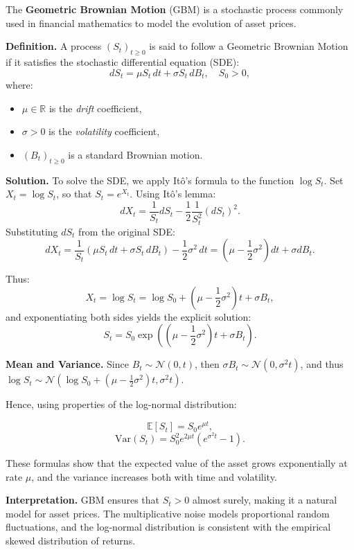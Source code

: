 
The \textbf{Geometric Brownian Motion} (GBM) is a stochastic process commonly used in financial mathematics to model the evolution of asset prices.

\textbf{Definition.} A process \( (S_t)_{t \geq 0} \) is said to follow a Geometric Brownian Motion if it satisfies the stochastic differential equation (SDE):
\[
dS_t = \mu S_t \, dt + \sigma S_t \, dB_t, \quad S_0 > 0,
\]
where:
\begin{itemize}
    \item \( \mu \in \mathbb{R} \) is the \textit{drift} coefficient,
    \item \( \sigma > 0 \) is the \textit{volatility} coefficient,
    \item \( (B_t)_{t \geq 0} \) is a standard Brownian motion.
\end{itemize}

\textbf{Solution.}  
To solve the SDE, we apply Itô's formula to the function \( \log S_t \). Set \( X_t = \log S_t \), so that \( S_t = e^{X_t} \). Using Itô's lemma:
\[
dX_t = \frac{1}{S_t} dS_t - \frac{1}{2} \frac{1}{S_t^2} (dS_t)^2.
\]
Substituting \( dS_t \) from the original SDE:
\[
dX_t = \frac{1}{S_t}(\mu S_t \, dt + \sigma S_t \, dB_t) - \frac{1}{2} \sigma^2 \, dt = \left( \mu - \frac{1}{2} \sigma^2 \right) dt + \sigma dB_t.
\]

Thus:
\[
X_t = \log S_t = \log S_0 + \left( \mu - \frac{1}{2} \sigma^2 \right)t + \sigma B_t,
\]
and exponentiating both sides yields the explicit solution:
\[
S_t = S_0 \exp \left( \left( \mu - \frac{1}{2} \sigma^2 \right)t + \sigma B_t \right).
\]

\textbf{Mean and Variance.}  
Since \( B_t \sim \mathcal{N}(0,t) \), then \( \sigma B_t \sim \mathcal{N}(0, \sigma^2 t) \), and thus \( \log S_t \sim \mathcal{N}(\log S_0 + (\mu - \frac{1}{2} \sigma^2)t, \sigma^2 t) \).

Hence, using properties of the log-normal distribution:

\[
\mathbb{E}[S_t] = S_0 e^{\mu t},
\]
\[
\text{Var}(S_t) = S_0^2 e^{2\mu t} \left( e^{\sigma^2 t} - 1 \right).
\]

These formulas show that the expected value of the asset grows exponentially at rate \( \mu \), and the variance increases both with time and volatility.

\textbf{Interpretation.}  
GBM ensures that \( S_t > 0 \) almost surely, making it a natural model for asset prices. The multiplicative noise models proportional random fluctuations, and the log-normal distribution is consistent with the empirical skewed distribution of returns.
